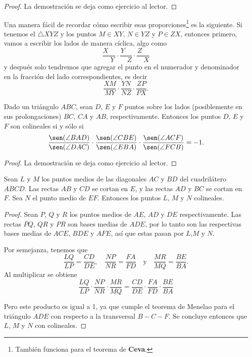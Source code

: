 \begin{proof}
    La demostración se deja como ejercicio al lector.
\end{proof}

\begin{remark.tcb}
    Una manera fácil de recordar cómo escribir esas proporciones\footnote{También funciona para el teorema de \textbf{Ceva}.} es la siguiente.
    Si tenemos el $\triangle XYZ$ y los puntos $M \in XY$, $N \in YZ$ y $P \in ZX$, entonces primero, vamos a escribir los lados de manera cíclica, algo como
    \[
        \frac{X\quad}{\quad Y} \cdot \frac{Y\quad}{\quad Z} \cdot \frac{Z\quad}{\quad X}
    \]
    y después solo tendremos que agregar el punto en el numerador y denominador en la fracción del lado correspondientes, es decir
    \[
        \frac{XM}{MY} \cdot \frac{YN}{NZ} \cdot \frac{ZP}{PX}.
    \]
\end{remark.tcb}

\begin{section-theorem.tcb}
    Dado un triángulo $ABC$, sean $D$, $E$ y $F$ puntos sobre los lados (posiblemente en sus prolongaciones) $BC$, $CA$ y $AB$, respectivamente.
    Entonces los puntos $D$, $E$ y $F$ son colineales si y sólo si
    \[
        \frac{\sen(\angle BAD)}{\sen(\angle DAC)} \cdot \frac{\sen(\angle CBE)}{\sen(\angle EBA)} \cdot \frac{\sen(\angle ACF)}{\sen(\angle FCB)} = -1.
    \]
\end{section-theorem.tcb}
\begin{proof}
    La demostración se deja como ejercicio al lector.
\end{proof}


\begin{section-theorem.tcb}
    Sean $L$ y $M$ los puntos medios de las diagonales $AC$ y $BD$ del cuadrilátero $ABCD$.
    Las rectas $AB$ y $CD$ se cortan en $E$, y las rectas $AD$ y $BC$ se cortan en $F$.
    Sea $N$ el punto medio de $EF$.
    Entonces los puntos $L$, $M$ y $N$ colineales.
\end{section-theorem.tcb}
\begin{proof}
    Sean $P$, $Q$ y $R$ los puntos medios de $AE$, $AD$ y $DE$ respectivamente.
    Las rectas $PQ$, $QR$ y $PR$ son bases medias de $ADE$, por lo tanto son las respectivas bases medias de $ACE$, $BDE$ y $AFE$, así que estas pasan por $L$,$M$ y $N$.
    \begin{multicols}{2}
    \begin{figure}[H]
        \centering
        
    \end{figure}
    Por semejanza, tenemos que
    \[
        \frac{LQ}{LP} = \frac{CD}{DE},\quad \frac{NP}{NR} = \frac{FA}{FD}\quad \text{y} \quad \frac{MR}{MQ} = \frac{BE}{BA}.
    \]
    Al multiplicar se obtiene
    \[
        \frac{LQ}{LP} \cdot \frac{NP}{NR} \cdot \frac{MR}{MQ} = \frac{CD}{DE} \cdot \frac{FA}{FD} \cdot \frac{BE}{BA}
    \]
    \end{multicols}
    Pero este producto es igual a 1, ya que cumple el teorema de Menelao para el triángulo $ADE$ con respecto a la transversal $B-C-F$.
    Se concluye entonces que $L$, $M$ y $N$ con colineales.
\end{proof}



